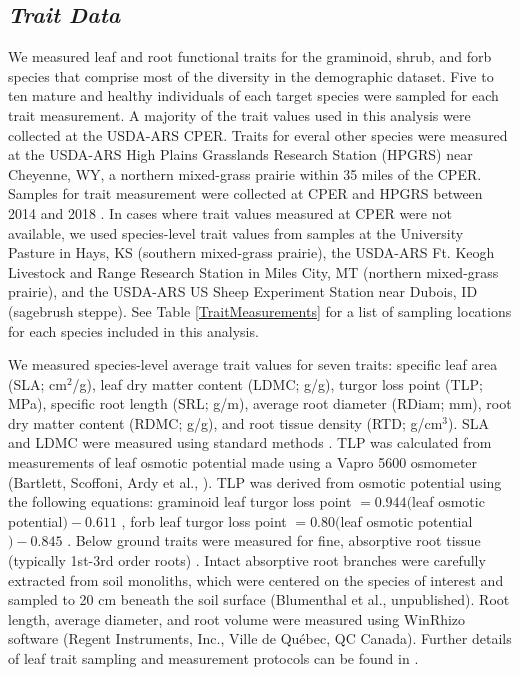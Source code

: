 \documentclass[12pt, letterpaper]{article}
\begin{document}
\subsection{\textit{Trait Data}} We measured leaf and root functional traits for the graminoid, shrub, and forb species that comprise most of the diversity in the demographic dataset. Five to ten mature and healthy individuals of each target species were sampled for each trait measurement. A majority of the trait values used in this analysis were collected at the USDA-ARS CPER. Traits for everal other species were measured at the USDA-ARS High Plains Grasslands Research Station (HPGRS) near Cheyenne, WY, a northern mixed-grass prairie within 35 miles of the CPER. Samples for trait measurement were collected at CPER and HPGRS between 2014 and 2018 \cite{Blumenthal2020}. In cases where trait values measured at CPER were not available, we used species-level trait values from samples at the University Pasture in Hays, KS (southern mixed-grass prairie), the USDA-ARS Ft. Keogh Livestock and Range Research Station in Miles City, MT (northern mixed-grass prairie), and the USDA-ARS US Sheep Experiment Station near Dubois, ID (sagebrush steppe). See Table \ref{TraitMeasurements} for a list of sampling locations for each species included in this analysis. 

We measured species-level average trait values for seven traits: specific leaf area (SLA; cm$^2$/g), leaf dry matter content (LDMC; g/g), turgor loss point (TLP; MPa), specific root length (SRL; g/m), average root diameter (RDiam; mm), root dry matter content (RDMC; g/g), and root tissue density (RTD; g/cm$^3$). SLA and LDMC were measured using standard methods \cite{Perez-Harguindeguy2013}. TLP was calculated from measurements of leaf osmotic potential made using a Vapro 5600 osmometer (Bartlett, Scoffoni, Ardy et al., ). TLP was derived from osmotic potential using the following equations: graminoid leaf turgor loss point $= 0.944($leaf osmotic potential$)-0.611$ , forb leaf turgor loss point $= 0.80($leaf osmotic potential$)-0.845$ \cite{ Griffin-Nolan2019}. Below ground traits were measured for fine, absorptive root tissue (typically 1st-3rd order roots) \cite{McCormack2015}. Intact absorptive root branches were carefully extracted from soil monoliths, which were centered on the species of interest and sampled to 20 cm beneath the soil surface (Blumenthal et al., unpublished). Root length, average diameter, and root volume were measured using WinRhizo software (Regent Instruments, Inc., Ville de Québec, QC Canada). Further details of leaf trait sampling and measurement protocols can be found in \cite{Blumenthal2020}.
\end{document}
